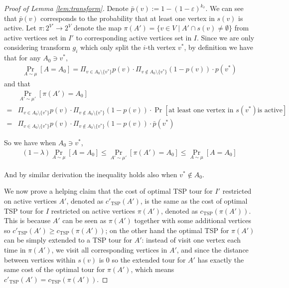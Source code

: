 \documentclass[12pt]{amsart}
\begin{document}
\begin{proof}[Proof of Lemma \ref{lem:transform}]
    \newcommand{\bp}[0]{\bar{p}}
    \newcommand{\tsp}[0]{\text{TSP}}
    Denote $\bp(v) := 1 - (1 - \varepsilon)^{k_v}$. We can see that  $\bp(v)$ corresponds to the probability that at least one vertex in $s(v)$ is active. Let $\pi: 2^{V'} \rightarrow 2^{V}$ denote the map $\pi(A') = \{v \in V \mid A' \cap s(v) \neq \emptyset\}$ from active vertices set in $I'$ to corresponding active vertices set in $I$. Since we are only considering transform $g_i$ which only split the $i$-th vertex $v^*$, by definition we have that for any $A_0 \ni v^*$, 
    \begin{align*}
        \Pr_{A \sim \mu}[A = A_0] = \Pi_{v \in A_0 \setminus \{v^*\}} p(v) \cdot \Pi_{v \notin A_0 \setminus \{v^*\}}(1 - p(v)) \cdot p(v^*)
    \end{align*}
    and that
    \begin{align*}
        &\Pr_{A' \sim \mu'} [\pi(A') = A_0] \\
        =& \Pi_{v \in A_0 \setminus \{v^*\}} p(v) \cdot \Pi_{v \notin A_0 \setminus \{v^*\}}(1 - p(v)) \cdot \Pr[\text{at least one vertex in } s(v^*) \text{is active}] \\
        =& \Pi_{v \in A_0 \setminus \{v^*\}} p(v) \cdot \Pi_{v \notin A_0 \setminus \{v^*\}}(1 - p(v)) \cdot \bp(v^*)
    \end{align*}
    
    So we have when $A_0 \ni v^*$, 
    \begin{align*}
       (1-\lambda)\Pr_{A \sim \mu}[A = A_0] \le\Pr_{A' \sim \mu'}[\pi(A') = A_0] \le \Pr_{A \sim \mu}[A = A_0]
    \end{align*}

    And by similar derivation the inequality holds also when $v^* \notin A_0$.

    We now prove a helping claim that the cost of optimal TSP tour for $I'$ restricted on active vertices $A'$, denoted as $c'_\tsp(A')$, is the same as the cost of optimal TSP tour for $I$ restricted on active vertices $\pi(A')$, denoted as $c_\tsp(\pi(A'))$. This is because $A'$ can be seen as $\pi(A')$ together with some additional vertices so $c'_\tsp(A') \ge c_\tsp(\pi(A'))$; on the other hand the optimal TSP for $\pi(A')$ can be simply extended to a TSP tour for $A'$: instead of visit one vertex each time in $\pi(A')$, we visit all corresponding vertices in $A'$, and since the distance between vertices within $s(v)$ is $0$ so the extended tour for $A'$ has exactly the same cost of the optimal tour for $\pi(A')$, which means  $c'_\tsp(A') = c_\tsp(\pi(A'))$.


\end{proof}
\end{document}

